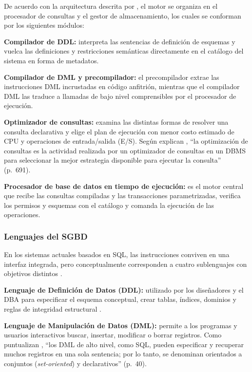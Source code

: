 De acuerdo con la arquitectura descrita por \textcites[pp.~41--44]{elmasri_navathe}[pp.~4--5]{silberschatz_dbconcepts}, el motor se organiza en el procesador de consultas y el gestor de almacenamiento, los cuales se conforman por los siguientes módulos:

\textbf{Compilador de DDL:} interpreta las sentencias de definición de esquemas y vuelca las definiciones y restricciones semánticas directamente en el catálogo del sistema en forma de metadatos.

\textbf{Compilador de DML y precompilador:} el precompilador extrae las instrucciones DML incrustadas en código anfitrión, mientras que el compilador DML las traduce a llamadas de bajo nivel comprensibles por el procesador de ejecución.

\textbf{Optimizador de consultas:} examina las distintas formas de resolver una consulta declarativa y elige el plan de ejecución con menor costo estimado de CPU y operaciones de entrada/salida (E/S). Según explican \textcite{elmasri_navathe}, \enquote{la optimización de consultas es la actividad realizada por un optimizador de consultas en un DBMS para seleccionar la mejor estrategia disponible para ejecutar la consulta} (p.~691).

\textbf{Procesador de base de datos en tiempo de ejecución:} es el motor central que recibe las consultas compiladas y las transacciones parametrizadas, verifica los permisos y esquemas con el catálogo y comanda la ejecución de las operaciones.

\subsubsection{Lenguajes del SGBD}

En los sistemas actuales basados en SQL, las instrucciones conviven en una interfaz integrada, pero conceptualmente corresponden a cuatro sublenguajes con objetivos distintos \parencites[pp.~38--41]{elmasri_navathe}[pp.~42--44, 74]{silberschatz_dbconcepts}.

\textbf{Lenguaje de Definición de Datos (DDL):} utilizado por los diseñadores y el DBA para especificar el esquema conceptual, crear tablas, índices, dominios y reglas de integridad estructural \parencite[p.~39]{elmasri_navathe}.

\textbf{Lenguaje de Manipulación de Datos (DML):} permite a los programas y usuarios interactivos buscar, insertar, modificar o borrar registros. Como puntualizan \textcite{elmasri_navathe}, \enquote{los DML de alto nivel, como SQL, pueden especificar y recuperar muchos registros en una sola sentencia; por lo tanto, se denominan orientados a conjuntos (\textit{set-oriented}) y declarativos} (p.~40).

